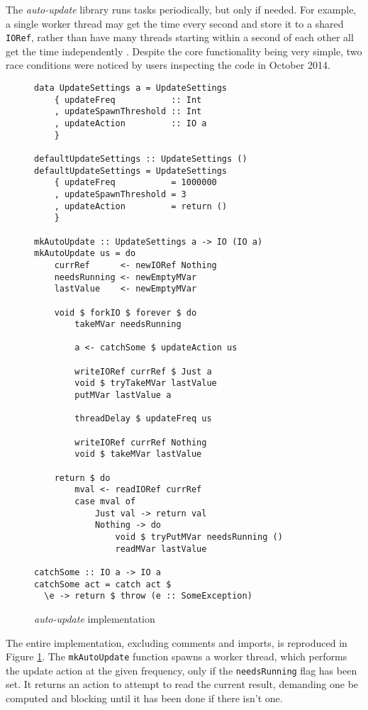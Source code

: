 The \emph{auto-update} library runs tasks periodically, but only if
needed. For example, a single worker thread may get the time every
second and store it to a shared \verb|IORef|, rather than have many
threads starting within a second of each other all get the time
independently \citep{autoupdate}. Despite the core functionality being
very simple, two race conditions were noticed by users inspecting the
code in October 2014.

\begin{figure}[t]
  \captionsetup{format=fnoline}
  \centering
  \begin{verbatim}
data UpdateSettings a = UpdateSettings
    { updateFreq           :: Int
    , updateSpawnThreshold :: Int
    , updateAction         :: IO a
    }

defaultUpdateSettings :: UpdateSettings ()
defaultUpdateSettings = UpdateSettings
    { updateFreq           = 1000000
    , updateSpawnThreshold = 3
    , updateAction         = return ()
    }

mkAutoUpdate :: UpdateSettings a -> IO (IO a)
mkAutoUpdate us = do
    currRef      <- newIORef Nothing
    needsRunning <- newEmptyMVar
    lastValue    <- newEmptyMVar

    void $ forkIO $ forever $ do
        takeMVar needsRunning

        a <- catchSome $ updateAction us

        writeIORef currRef $ Just a
        void $ tryTakeMVar lastValue
        putMVar lastValue a

        threadDelay $ updateFreq us

        writeIORef currRef Nothing
        void $ takeMVar lastValue

    return $ do
        mval <- readIORef currRef
        case mval of
            Just val -> return val
            Nothing -> do
                void $ tryPutMVar needsRunning ()
                readMVar lastValue

catchSome :: IO a -> IO a
catchSome act = catch act $
  \e -> return $ throw (e :: SomeException)
  \end{verbatim}
  \caption{\emph{auto-update} implementation}
  \label{fig:example-autoupdate}
\end{figure}

The entire implementation, excluding comments and imports, is
reproduced in Figure \ref{fig:example-autoupdate}. The
\verb|mkAutoUpdate| function spawns a worker thread, which performs
the update action at the given frequency, only if the
\verb|needsRunning| flag has been set. It returns an action to attempt
to read the current result, demanding one be computed and blocking
until it has been done if there isn't one.

